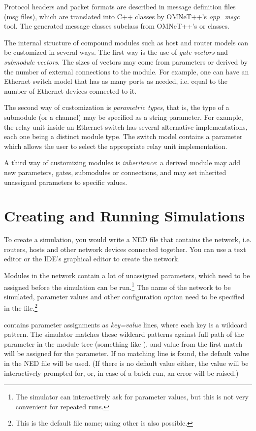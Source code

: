 Protocol headers and packet formats are described in message definition
files (msg files), which are translated into C++ classes by OMNeT++'s
\textit{opp\_msgc} tool. The generated message classes subclass from OMNeT++'s
 or  classes.

The internal structure of compound modules such as host and router models
can be customized in several ways. The first way is the use of \textit{gate
vectors} and \textit{submodule vectors}. The sizes of vectors may come from
parameters or derived by the number of external connections to the module.
For example, one can have an Ethernet switch model that has as many ports
as needed, i.e. equal to the number of Ethernet devices connected to it.

The second way of customization is \textit{parametric types}, that is, the
type of a submodule (or a channel) may be specified as a string parameter.
For example, the relay unit inside an Ethernet switch has several
alternative implementations, each one being a distinct module type. The
switch model contains a parameter which allows the user to select the
appropriate relay unit implementation.

A third way of customizing modules is \textit{inheritance}: a derived
module may add new parameters, gates, submodules or connections, and may
set inherited unassigned parameters to specific values.


\section{Creating and Running Simulations}

To create a simulation, you would write a NED file that contains the network,
i.e. routers, hosts and other network devices connected together. You can
use a text editor or the IDE's graphical editor to create the network.

Modules in the network contain a lot of unassigned parameters, which need
to be assigned before the simulation can be run.\footnote{The simulator can
interactively ask for parameter values, but this is not very convenient
for repeated runs.} The name of the network to be simulated, parameter values
and other configuration option need to be specified in the 
file.\footnote{This is the default file name; using other is also possible.}

 contains parameter assignments as \textit{key=value}
lines, where each key is a wildcard pattern. The simulator matches these
wildcard patterns against full path of the parameter in the module tree
(something like ), and value from
the first match will be assigned for the parameter. If no matching line is
found, the default value in the NED file will be used. (If there is no
default value either, the value will be interactively prompted for, or, in
case of a batch run, an error will be raised.)

